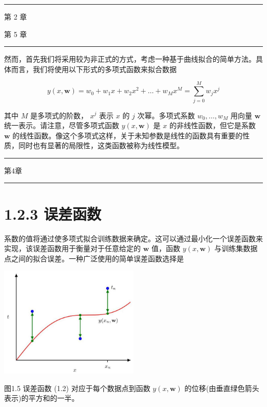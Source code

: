 \documentclass[10pt]{report}
\newcommand{\HRule}{\begin{center}\rule{0.9\linewidth}{0.2mm}\end{center}}
\begin{document}
\HRule

第 2 章

第 5 章

\HRule

然而，首先我们将采用较为非正式的方式，考虑一种基于曲线拟合的简单方法。具体而言，我们将使用以下形式的多项式函数来拟合数据

\[
y\left( {x,\mathbf{w}}\right)  = {w}_{0} + {w}_{1}x + {w}_{2}{x}^{2} + \ldots  + {w}_{M}{x}^{M} = \mathop{\sum }\limits_{{j = 0}}^{M}{w}_{j}{x}^{j} \tag{1.1}
\]

其中 \(M\) 是多项式的阶数， \({x}^{j}\) 表示 \(x\) 的 \(j\) 次幂。多项式系数 \({w}_{0},\ldots ,{w}_{M}\) 用向量 \(\mathbf{w}\) 统一表示。请注意，尽管多项式函数 \(y\left( {x,\mathbf{w}}\right)\) 是 \(x\) 的非线性函数，但它是系数 \(\mathbf{w}\) 的线性函数。像这个多项式这样，关于未知参数是线性的函数具有重要的性质，同时也有显著的局限性，这类函数被称为线性模型。

\HRule

第4章

\HRule

\section*{1.2.3 误差函数}

系数的值将通过使多项式拟合训练数据来确定。这可以通过最小化一个误差函数来实现，该误差函数用于衡量对于任意给定的 \(\mathbf{w}\) 值，函数 \(y\left( {x,\mathbf{w}}\right)\) 与训练集数据点之间的拟合误差。一种广泛使用的简单误差函数选择是

\begin{center}
\includegraphics[max width=0.5\textwidth]{images/0194e279-9b28-703a-88f4-c3ac21e2010d_28_873_342_686_544_0.jpg}
\end{center}
\hspace*{3em} 

图1.5 误差函数 (1.2) 对应于每个数据点到函数 \(y\left( {x,\mathbf{w}}\right)\) 的位移(由垂直绿色箭头表示)的平方和的一半。
\end{document}
